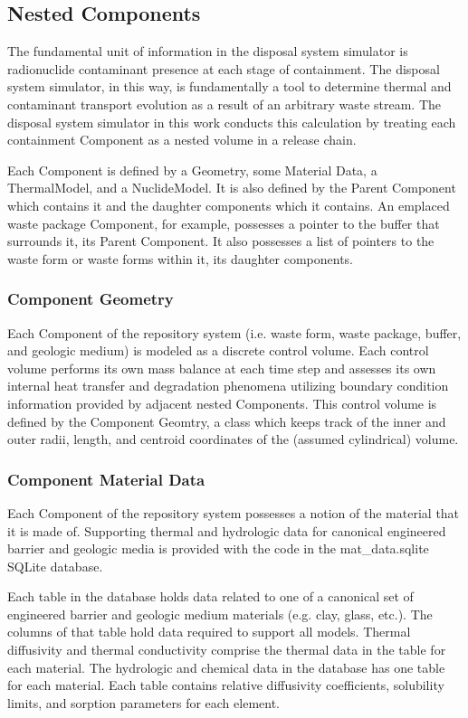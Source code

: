 \subsection{Nested Components}

The fundamental unit of information in the disposal system simulator is radionuclide 
contaminant presence at each stage of containment.  The disposal system simulator, in 
this way, is fundamentally a tool to determine thermal and contaminant 
transport evolution as a result of an arbitrary waste stream. The disposal 
system simulator in this work conducts this calculation by  treating each containment 
Component as a nested volume in a release chain. 

Each Component is defined by a Geometry, some Material Data, a ThermalModel, 
and a NuclideModel. It is also defined by the Parent Component which contains 
it and the daughter components which it contains. An emplaced waste package 
Component, for example, possesses a pointer to the buffer that surrounds it, 
its Parent Component. It also possesses a list of pointers to the waste form or 
waste forms within it, its daughter components. 

\subsubsection{Component Geometry}

Each Component of the repository system (i.e. waste form, waste package, buffer, 
and geologic medium) is modeled as a discrete control volume. Each control 
volume performs its own mass balance at each time step and assesses its own 
internal  heat transfer and degradation phenomena utilizing boundary condition 
information provided by adjacent nested Components. This control volume is 
defined by the Component Geomtry, a class which keeps track of the inner and 
outer radii, length, and centroid coordinates of the (assumed cylindrical) 
volume.

\subsubsection{Component Material Data}

Each Component of the repository system possesses a notion of the material that 
it is made of. Supporting thermal and hydrologic data for canonical engineered 
barrier and geologic media is provided with the code in the 
mat\_data.sqlite SQLite database.

Each table in the database holds data related to one of a canonical set of 
engineered barrier and geologic medium materials (e.g. clay, glass, etc.).  
The columns of that table hold data required to support all \Cyder models. 
Thermal diffusivity and thermal conductivity comprise the thermal data in the 
table for each material. The hydrologic and chemical data in the database has 
one table for each material. Each table contains relative diffusivity 
coefficients, solubility limits, and sorption parameters for each element.  

